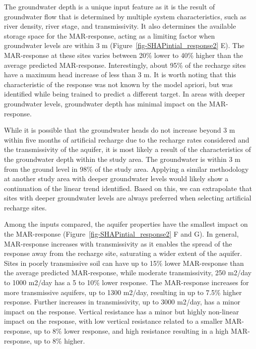 \documentclass[
]{agujournal2019}
\begin{document}
The groundwater depth is a unique input feature as it is the result of
groundwater flow that is determined by multiple system characteristics,
such as river density, river stage, and transmissivity. It also
determines the available storage space for the MAR-response, acting as a
limiting factor when groundwater levels are within 3 m
(Figure~\ref{fig-SHAPintial_response2} E). The MAR-response at these
sites varies between 20\% lower to 40\% higher than the average
predicted MAR-response. Interestingly, about 95\% of the recharge sites
have a maximum head increase of less than 3 m. It is worth noting that
this characteristic of the response was not known by the model apriori,
but was identified while being trained to predict a different target. In
areas with deeper groundwater levels, groundwater depth has minimal
impact on the MAR-response.

While it is possible that the groundwater heads do not increase beyond 3
m within five months of artificial recharge due to the recharge rates
considered and the transmissivity of the aquifer, it is most likely a
result of the characteristics of the groundwater depth within the study
area. The groundwater is within 3 m from the ground level in 98\% of the
study area. Applying a similar methodology at another study area with
deeper groundwater levels would likely show a continuation of the linear
trend identified. Based on this, we can extrapolate that sites with
deeper groundwater levels are always preferred when selecting artificial
recharge sites.

Among the inputs compared, the aquifer properties have the smallest
impact on the MAR-response (Figure~\ref{fig-SHAPintial_response2} F and
G). In general, MAR-response increases with transmissivity as it enables
the spread of the response away from the recharge site, saturating a
wider extent of the aquifer. Sites in poorly transmissive soil can have
up to 15\% lower MAR-response than the average predicted MAR-response,
while moderate transmissivity, 250 m2/day to 1000 m2/day has a 5 to 10\%
lower response. The MAR-response increases for more transmissive
aquifers, up to 1300 m2/day, resulting in up to 7.5\% higher response.
Further increases in transmissivity, up to 3000 m2/day, has a minor
impact on the response. Vertical resistance has a minor but highly
non-linear impact on the response, with low vertical resistance related
to a smaller MAR-response, up to 8\% lower response, and high resistance
resulting in a high MAR-response, up to 8\% higher.
\end{document}
